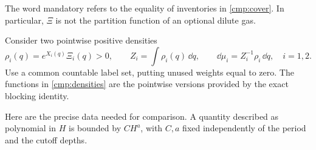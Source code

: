 The word mandatory refers to the equality of inventories in
\eqref{cmp:cover}.  In particular, \(\Xi\) is not the partition function
of an optional dilute gas.

Consider two pointwise positive densities
\begin{equation}
 \rho_i(q)=e^{X_i(q)}\Xi_i(q)>0,\qquad
 Z_i=\int\rho_i(q)\,\dd q,\qquad
 \dd\mu_i=Z_i^{-1}\rho_i\,\dd q,\quad i=1,2 .
 \label{cmp:densities}
\end{equation}
Use a common countable label set, putting unused weights equal to zero.
The functions in \eqref{cmp:densities} are the pointwise versions
provided by the exact blocking identity.

Here are the precise data needed for comparison.  A quantity described
as polynomial in \(H\) is bounded by \(CH^a\), with \(C,a\) fixed
independently of the period and the cutoff depths.

